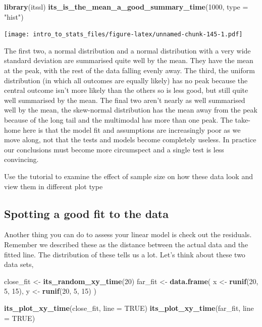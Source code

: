 \documentclass[
]{book}
\newenvironment{Shaded}{\begin{snugshade}}{\end{snugshade}}
\newcommand{\DataTypeTok}[1]{\textcolor[rgb]{0.13,0.29,0.53}{#1}}
\newcommand{\DecValTok}[1]{\textcolor[rgb]{0.00,0.00,0.81}{#1}}
\newcommand{\KeywordTok}[1]{\textcolor[rgb]{0.13,0.29,0.53}{\textbf{#1}}}
\newcommand{\NormalTok}[1]{#1}
\newcommand{\OtherTok}[1]{\textcolor[rgb]{0.56,0.35,0.01}{#1}}
\newcommand{\StringTok}[1]{\textcolor[rgb]{0.31,0.60,0.02}{#1}}
\newenvironment{task}
{ \begin{tcolorbox}[title=For you to do,title filled] }
{  \end{tcolorbox} }
\begin{document}
\begin{Shaded}
\begin{Highlighting}[]
\KeywordTok{library}\NormalTok{(itssl)}
\KeywordTok{its_is_the_mean_a_good_summary_time}\NormalTok{(}\DecValTok{1000}\NormalTok{, }\DataTypeTok{type =} \StringTok{"hist"}\NormalTok{)}
\end{Highlighting}
\end{Shaded}

\texttt{[image: intro\_to\_stats\_files/figure-latex/unnamed-chunk-145-1.pdf]}

The first two, a normal distribution and a normal distribution with a very wide standard deviation are summarised quite well by the mean. They have the mean at the peak, with the rest of the data falling evenly away. The third, the uniform distribution (in which all outcomes are equally likely) has no peak because the central outcome isn't more likely than the others so is less good, but still quite well summarised by the mean. The final two aren't nearly as well summarised well by the mean, the skew-normal distribution has the mean away from the peak because of the long tail and the multimodal has more than one peak. The take-home here is that the model fit and assumptions are increasingly poor as we move along, not that the tests and models become completely useless. In practice our conclusions must become more circumspect and a single test is less convincing.

\begin{task}
Use the tutorial to examine the effect of sample size on how these data look and view them in different plot type
\end{task}

\hypertarget{spotting-a-good-fit-to-the-data}{%
\subsection{Spotting a good fit to the data}\label{spotting-a-good-fit-to-the-data}}

Another thing you can do to assess your linear model is check out the residuals. Remember we described these as the distance between the actual data and the fitted line. The distribution of these tells us a lot. Let's think about these two data sets,

\begin{Shaded}
\begin{Highlighting}[]
\NormalTok{close_fit <-}\StringTok{ }\KeywordTok{its_random_xy_time}\NormalTok{(}\DecValTok{20}\NormalTok{)}
\NormalTok{far_fit <-}\StringTok{ }\KeywordTok{data.frame}\NormalTok{(}
\NormalTok{  x <-}\StringTok{ }\KeywordTok{runif}\NormalTok{(}\DecValTok{20}\NormalTok{, }\DecValTok{5}\NormalTok{, }\DecValTok{15}\NormalTok{),}
\NormalTok{  y <-}\StringTok{ }\KeywordTok{runif}\NormalTok{(}\DecValTok{20}\NormalTok{, }\DecValTok{5}\NormalTok{, }\DecValTok{15}\NormalTok{)}
\NormalTok{)}

\KeywordTok{its_plot_xy_time}\NormalTok{(close_fit, }\DataTypeTok{line =} \OtherTok{TRUE}\NormalTok{)}
\KeywordTok{its_plot_xy_time}\NormalTok{(far_fit, }\DataTypeTok{line =} \OtherTok{TRUE}\NormalTok{)}
\end{Highlighting}
\end{Shaded}
\end{document}
